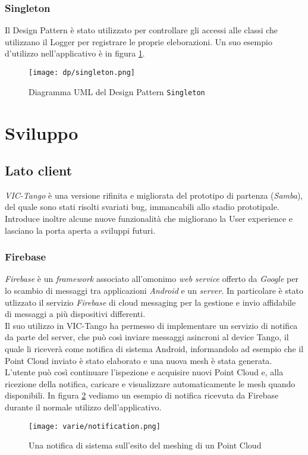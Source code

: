 \subsubsection{Singleton}
Il Design Pattern è stato utilizzato per controllare gli accessi alle classi che utilizzano il Logger per registrare le proprie eleborazioni. Un suo esempio d'utilizzo nell'applicativo è in figura \ref{fig:singleton}.
\begin{figure}[!h] 
    \centering 
    \texttt{[image: dp/singleton.png]} 
    \caption{Diagramma UML del Design Pattern \texttt{Singleton}}
   \label{fig:singleton}
\end{figure}
\newline

\section{Sviluppo}

\subsection{Lato client}
\emph{VIC-Tango} è una versione rifinita e migliorata del prototipo di partenza (\emph{Samba}), del quale sono stati risolti svariati bug, immancabili allo stadio prototipale. Introduce inoltre alcune nuove funzionalità che migliorano la User experience e lasciano la porta aperta a sviluppi futuri.

\subsubsection{Firebase}
\emph{Firebase} è un \emph{framework} associato all'omonimo \emph{web service} offerto da \emph{Google} per lo scambio di messaggi tra applicazioni \emph{Android} e un \emph{server}. In particolare è stato utlizzato il servizio \emph{Firebase} di cloud messaging per la gestione e invio affidabile di messaggi a più dispositivi differenti.\\ Il suo utilizzo in VIC-Tango ha permesso di implementare un servizio di notifica da parte del server, che può così inviare messaggi asincroni al device Tango, il quale li riceverà come notifica di sistema Android, informandolo ad esempio che il Point Cloud inviato è stato elaborato e una nuova mesh è stata generata. L'utente può così continuare l'ispezione e acquisire nuovi Point Cloud e, alla ricezione della notifica, caricare e visualizzare automaticamente le mesh quando disponibili.
In figura \ref{fig:notification} vediamo un esempio di notifica ricevuta da Firebase durante il normale utilizzo dell'applicativo.
\begin{figure}[!h] 
    \centering 
    \texttt{[image: varie/notification.png]} 
    \caption{Una notifica di sistema sull'esito del meshing di un Point Cloud}
   \label{fig:notification}
\end{figure}
\newline

